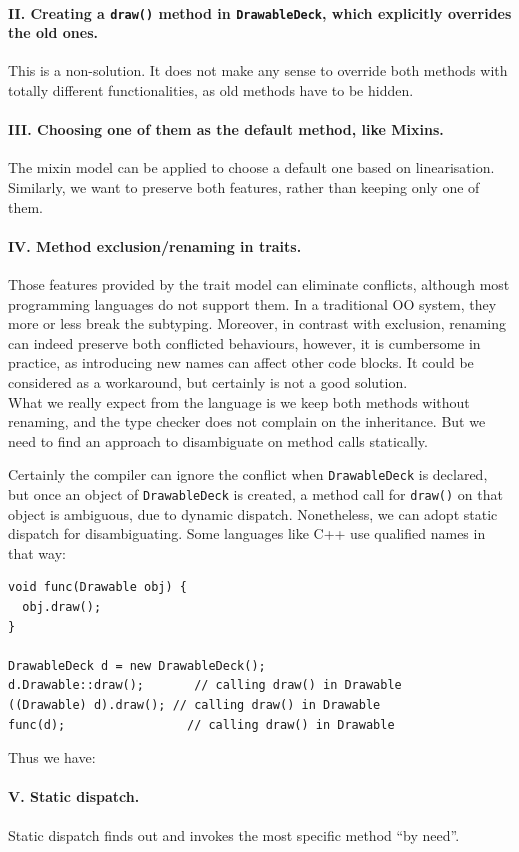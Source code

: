 \paragraph{II. Creating a \lstinline|draw()| method in \lstinline|DrawableDeck|, which explicitly overrides the old ones.}
This is a non-solution. It does not make any sense to override both methods with totally different functionalities, as old
methods have to be hidden.

\paragraph{III. Choosing one of them as the default method, like Mixins.} The mixin model can be applied to choose a
default one based on linearisation. Similarly, we want to preserve both features, rather than keeping only one of them.

\paragraph{IV. Method exclusion/renaming in traits.} Those features provided by the trait model can eliminate conflicts, although
most programming languages do not support them. In a traditional OO system, they more or less break the subtyping. Moreover, in
contrast with exclusion, renaming can indeed preserve both conflicted behaviours, however, it is cumbersome in practice, as introducing new names can affect other code blocks. It could be considered as a workaround, but certainly is not a good solution.\\

What we really expect from the language is we keep both methods without renaming, and the type checker does not complain on the
inheritance. But we need to find an approach to disambiguate on method calls statically.

Certainly the compiler can ignore the conflict when \lstinline|DrawableDeck| is declared, but once an object of \lstinline|DrawableDeck| is created, a method call for \lstinline|draw()| on that object is ambiguous, due to dynamic dispatch. Nonetheless, we can adopt static dispatch for disambiguating. Some languages like C++ use qualified names in that way:

\vspace{3pt}\begin{lstlisting}
void func(Drawable obj) {
  obj.draw();
}

DrawableDeck d = new DrawableDeck();
d.Drawable::draw();       // calling draw() in Drawable
((Drawable) d).draw(); // calling draw() in Drawable
func(d);                 // calling draw() in Drawable
\end{lstlisting}\vspace{3pt}
Thus we have: \paragraph{V. Static dispatch.} Static dispatch finds out and invokes the most specific method ``by need''.


